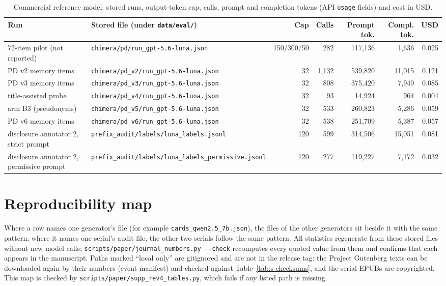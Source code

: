 \documentclass[11pt]{article}
\begin{document}
\begin{table}[!ht]\centering\scriptsize
\caption{Commercial reference model: stored runs, output-token cap, calls, prompt and completion tokens (API \texttt{usage} fields) and cost in USD.}\label{tab:s-api}
\begin{tabular}{p{3.1cm}p{5.2cm}rrrrr}
\toprule Run & Stored file (under \nolinkurl{data/eval/}) & Cap & Calls & Prompt tok. & Compl. tok. & USD \\ \midrule
72-item pilot (not reported) & \nolinkurl{chimera/pd/run_gpt-5.6-luna.json} & 150/300/50 & 282 & 117,136 & 1,636 & 0.025 \\
PD v2 memory items & \nolinkurl{chimera/pd_v2/run_gpt-5.6-luna.json} & 32 & 1,132 & 539,820 & 11,015 & 0.121 \\
PD v3 memory items & \nolinkurl{chimera/pd_v3/run_gpt-5.6-luna.json} & 32 & 808 & 375,420 & 7,940 & 0.085 \\
title-assisted probe & \nolinkurl{chimera/pd_v4/run_gpt-5.6-luna.json} & 32 & 93 & 14,924 & 964 & 0.004 \\
arm B3 (pseudonyms) & \nolinkurl{chimera/pd_v5/run_gpt-5.6-luna.json} & 32 & 533 & 260,823 & 5,286 & 0.059 \\
PD v6 memory items & \nolinkurl{chimera/pd_v6/run_gpt-5.6-luna.json} & 32 & 538 & 251,709 & 5,387 & 0.057 \\
disclosure annotator 2, strict prompt & \nolinkurl{prefix_audit/labels/luna_labels.jsonl} & 120 & 599 & 314,506 & 15,051 & 0.081 \\
disclosure annotator 2, permissive prompt & \nolinkurl{prefix_audit/labels/luna_labels_permissive.jsonl} & 120 & 277 & 119,227 & 7,172 & 0.032 \\
\bottomrule\end{tabular}\end{table}

\section{Reproducibility map}
Where a row names one generator's file (for example \texttt{cards\_qwen2.5\_7b.json}), the files of the other generators sit beside it with the same pattern; where it names one serial's audit file, the other two serials follow the same pattern. All statistics regenerate from these stored files without new model calls; \nolinkurl{scripts/paper/journal_numbers.py --check} recomputes every quoted value from them and confirms that each appears in the manuscript. Paths marked ``local only'' are gitignored and are not in the release tag: the Project Gutenberg texts can be downloaded again by their numbers (event manifest) and checked against Table~\ref{tab:s-checksums}, and the serial EPUBs are copyrighted. This map is checked by \nolinkurl{scripts/paper/supp_rev4_tables.py}, which fails if any listed path is missing.
\end{document}
